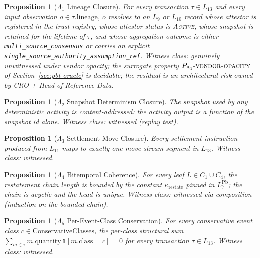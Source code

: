 \documentclass[11pt,a4paper]{article}
\newtheorem{proposition}[definition]{Proposition}
\begin{document}
\begin{proposition}[$\Lambda_1$ Lineage Closure]
\label{prop:lambda1}
For every transaction $\tau \in L_{13}$ and every input observation $o \in \tau.\text{lineage}$, $o$ resolves to an $L_9$ or $L_{10}$ record whose attestor is registered in the trust registry, whose attestor status is \textsc{Active}, whose snapshot is retained for the lifetime of $\tau$, and whose aggregation outcome is either \texttt{multi\_source\_consensus} or carries an explicit \texttt{single\_source\_authority\_assumption\_ref}. Witness class: \emph{genuinely unwitnessed under vendor opacity}; the surrogate property $P_{\Lambda_1}\textrm{-}\textsc{vendor-opacity}$ of Section~\ref{sec:pbt-oracle} is decidable; the residual is an architectural risk owned by CRO + Head of Reference Data.
\end{proposition}

\begin{proposition}[$\Lambda_2$ Snapshot Determinism Closure]
\label{prop:lambda2}
The snapshot used by any deterministic activity is content-addressed: the activity output is a function of the snapshot id alone. Witness class: \emph{witnessed} (replay test).
\end{proposition}

\begin{proposition}[$\Lambda_3$ Settlement-Move Closure]
\label{prop:lambda3}
Every settlement instruction produced from $L_{11}$ maps to exactly one move-stream segment in $L_{13}$. Witness class: \emph{witnessed}.
\end{proposition}

\begin{proposition}[$\Lambda_4$ Bitemporal Coherence]
\label{prop:lambda4}
For every leaf $L \in C_1 \cup C_4$, the restatement chain length is bounded by the constant $\kappa_{\mathrm{restate}}$ pinned in $L_7^{\mathrm{Pb}}$; the chain is acyclic and the head is unique. Witness class: \emph{witnessed via composition} (induction on the bounded chain).
\end{proposition}

\begin{proposition}[$\Lambda_5$ Per-Event-Class Conservation]
\label{prop:lambda5}
For every conservative event class $c \in \text{ConservativeClasses}$, the per-class structural sum $\sum_{m \in \tau} m.\text{quantity}\,\mathbb{1}[m.\text{class} = c] = 0$ for every transaction $\tau \in L_{13}$. Witness class: \emph{witnessed}.
\end{proposition}
\end{document}
